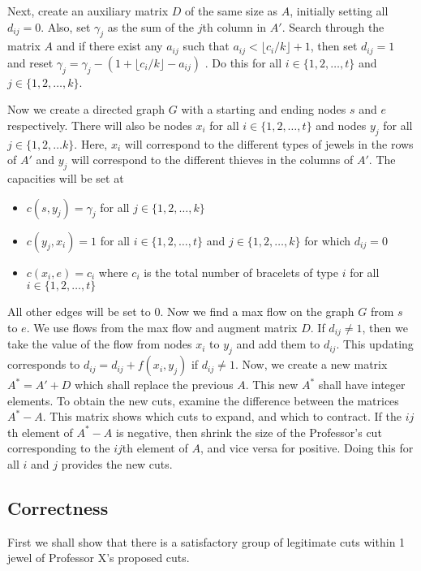 \documentclass{6046}
\begin{document}
Next, create an auxiliary matrix $D$ of the same size as $A$, initially setting all $d_{ij} = 0$. Also, set $\gamma_j$ as the sum of the $j$th column in $A'$.  Search through the matrix $A$ and if there exist any $a_{ij}$ such that $a_{ij} < \lfloor c_{i}/k \rfloor + 1$, then set $d_{ij} = 1$ and reset $\gamma_j = \gamma_j - (1 + \lfloor c_i / k \rfloor - a_{ij})$ . Do this for all $i \in \{1, 2, \ldots, t\}$ and $j \in \{1, 2, \ldots, k \}$. 

Now we create a directed graph $G$ with a starting and ending nodes $s$ and $e$ respectively. There will also be nodes $x_i$ for all $i \in \{1, 2, \ldots, t \}$ and nodes $y_j$ for all $j \in \{1, 2, \ldots k \}$. Here, $x_i$ will correspond to the different types of jewels in the rows of $A'$ and $y_j$ will correspond to the different thieves in the columns of $A'$. The capacities will be set at
\begin{itemize}
\item $c(s, y_j) = \gamma_j$ for all $j \in \{1,2, \ldots, k \}$
\item $c(y_j, x_i) = 1$ for all $i \in \{1,2, \ldots, t \}$ and $j \in \{1,2, \ldots, k \}$ for which $d_{ij} = 0$
\item $c(x_i, e) = c_i$ where $c_i$ is the total number of bracelets of type $i$ for all $i \in \{1,2, \ldots, t \}$
\end{itemize} 

All other edges will be set to $0$. Now we find a max flow on the graph $G$ from $s$ to $e$. We use flows from the max flow and augment matrix $D$. If $d_{ij} \neq 1$, then we take the value of the flow from nodes $x_i$ to $y_j$ and add them to $d_{ij}$. This updating corresponds to $d_{ij} = d_{ij} + f(x_i, y_j)$ if $d_{ij} \neq 1$. Now, we create a new matrix $A^* = A' + D$ which shall replace the previous $A$. This new $A^*$ shall have integer elements. To obtain the new cuts, examine the difference between the matrices $A^* - A$. This matrix shows which cuts to expand, and which to contract. If the $ij$th element of $A^* - A$ is negative, then shrink the size of the Professor's cut corresponding to the $ij$th element of $A$, and vice versa for positive. Doing this for all $i$ and $j$ provides the new cuts.

\subsection*{Correctness}

First we shall show that there is a satisfactory group of legitimate cuts within 1 jewel of Professor X's proposed cuts.
\end{document}
